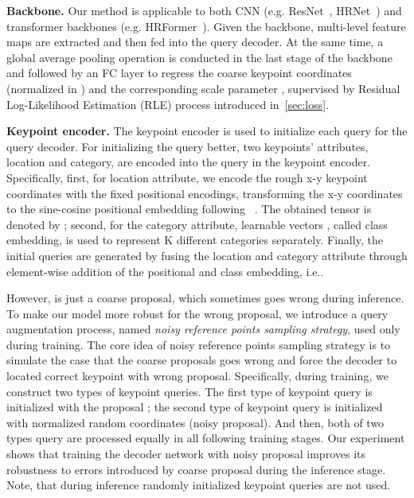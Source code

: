 \documentclass[runningheads]{llncs}
\def\ie{{i.e.\xspace}}
\begin{document}
\noindent\textbf{Backbone.} Our method is applicable to both CNN (e.g. ResNet~\cite{he2016deep}, HRNet~\cite{sun2019deep}) and transformer backbones (e.g. HRFormer~\cite{yuan2021hrformer}).  Given the backbone, multi-level feature maps are extracted and then fed into the query decoder. At the same time, a global average pooling operation is conducted in the last stage of the backbone and followed by an FC layer to regress the coarse keypoint coordinates  (normalized in ) and the corresponding scale parameter , supervised by Residual Log-Likelihood Estimation (RLE) process introduced in~\cref{sec:loss}.


\noindent\textbf{Keypoint encoder.} 
The keypoint encoder is used to initialize each query  for the query decoder. For initializing the query better, two keypoints' attributes, location and category, are encoded into the query in the keypoint encoder.
Specifically, first, for location attribute, we encode the rough x-y keypoint coordinates  with the fixed positional encodings, transforming the x-y coordinates to the sine-cosine positional embedding following ~\cite{vaswani2017attention}. The obtained tensor is denoted by ; second, for the category attribute,  learnable vectors , called class embedding, is used to represent K different categories separately. Finally, the initial queries  are generated by fusing the location and category attribute through element-wise addition of the positional and class embedding, \ie . 


However,  is just a coarse proposal, which sometimes goes wrong during inference. To make our model more robust for the wrong proposal, we introduce a query augmentation process, named \textit{noisy reference points sampling strategy}, used only during training. The core idea of noisy reference points sampling strategy is to simulate the case that the coarse proposals  goes wrong and force the decoder to located correct keypoint with wrong proposal. Specifically, during training, we construct two types of keypoint queries. The first type of keypoint query is initialized with the proposal ; the second type of keypoint query is initialized with normalized random coordinates  (noisy proposal). And then, both of two types query are processed equally in all following training stages. Our experiment shows that training the decoder network with noisy proposal  improves its robustness to errors introduced by coarse proposal  during the inference stage. Note, that during inference randomly initialized keypoint queries are not used.
\end{document}
